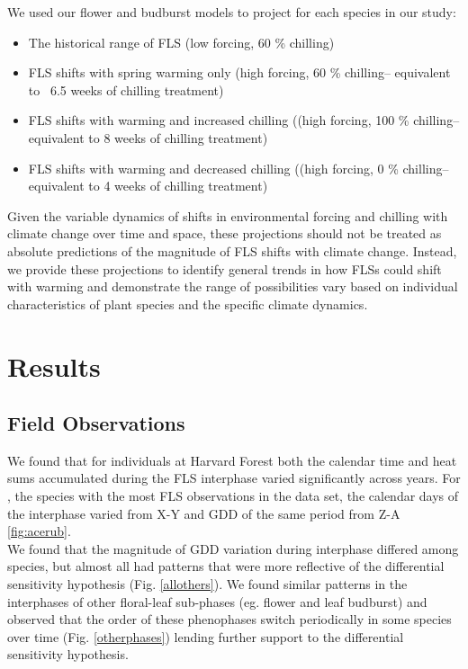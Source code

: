 \documentclass[11pt]{article}
\begin{document}
\noindent We used our flower and budburst models to project for each species in our study:\\
\begin{itemize}
\item The historical range of FLS (low forcing, 60 \% chilling)
\item FLS shifts with spring warming only (high forcing, 60 \% chilling-- equivalent to ~6.5 weeks of chilling treatment)
\item FLS shifts with warming and increased chilling ((high forcing, 100 \% chilling-- equivalent to 8 weeks of chilling treatment)
\item FLS shifts with warming and decreased chilling ((high forcing, 0 \% chilling-- equivalent to 4 weeks of chilling treatment)
\end{itemize}

\noindent Given the variable dynamics of shifts in environmental forcing and chilling with climate change over time and space, these projections should not be treated as absolute predictions of the magnitude of FLS shifts with climate change. Instead, we provide these projections to identify general trends in how FLSs could shift with warming and demonstrate the range of possibilities vary based on individual characteristics of plant species and the specific climate dynamics.\\

\section*{Results}
\subsection*{Field Observations}
We found that for individuals at Harvard Forest both the calendar time and heat sums accumulated during the FLS interphase varied significantly across years. For , the species with the most FLS observations in the data set, the calendar days of the interphase varied from X-Y and GDD of the same period from Z-A \ref{fig:acerub}.\\

\noindent We found that the magnitude of GDD variation during interphase differed among species, but almost all had patterns that were more reflective of the differential sensitivity hypothesis (Fig. \ref{allothers}). We found similar patterns in the interphases of other floral-leaf sub-phases (eg. flower and leaf budburst) and observed that the order of these phenophases switch periodically in some species over time (Fig. \ref{otherphases}) lending further support to the differential sensitivity hypothesis. 
\end{document}
